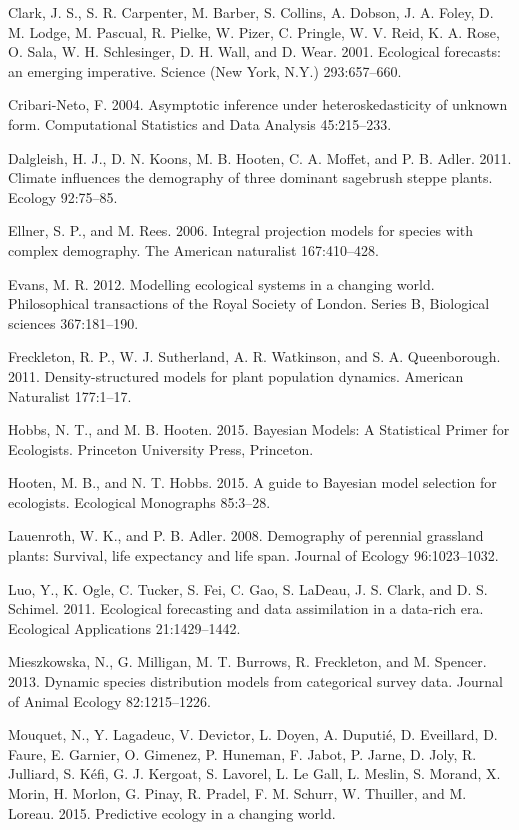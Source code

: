 \documentclass[12pt,]{article}
\begin{document}
Clark, J. S., S. R. Carpenter, M. Barber, S. Collins, A. Dobson, J. A.
Foley, D. M. Lodge, M. Pascual, R. Pielke, W. Pizer, C. Pringle, W. V.
Reid, K. A. Rose, O. Sala, W. H. Schlesinger, D. H. Wall, and D. Wear.
2001. Ecological forecasts: an emerging imperative. Science (New York,
N.Y.) 293:657--660.

Cribari-Neto, F. 2004. Asymptotic inference under heteroskedasticity of
unknown form. Computational Statistics and Data Analysis 45:215--233.

Dalgleish, H. J., D. N. Koons, M. B. Hooten, C. A. Moffet, and P. B.
Adler. 2011. Climate influences the demography of three dominant
sagebrush steppe plants. Ecology 92:75--85.

Ellner, S. P., and M. Rees. 2006. Integral projection models for species
with complex demography. The American naturalist 167:410--428.

Evans, M. R. 2012. Modelling ecological systems in a changing world.
Philosophical transactions of the Royal Society of London. Series B,
Biological sciences 367:181--190.

Freckleton, R. P., W. J. Sutherland, A. R. Watkinson, and S. A.
Queenborough. 2011. Density-structured models for plant population
dynamics. American Naturalist 177:1--17.

Hobbs, N. T., and M. B. Hooten. 2015. Bayesian Models: A Statistical
Primer for Ecologists. Princeton University Press, Princeton.

Hooten, M. B., and N. T. Hobbs. 2015. A guide to Bayesian model
selection for ecologists. Ecological Monographs 85:3--28.

Lauenroth, W. K., and P. B. Adler. 2008. Demography of perennial
grassland plants: Survival, life expectancy and life span. Journal of
Ecology 96:1023--1032.

Luo, Y., K. Ogle, C. Tucker, S. Fei, C. Gao, S. LaDeau, J. S. Clark, and
D. S. Schimel. 2011. Ecological forecasting and data assimilation in a
data-rich era. Ecological Applications 21:1429--1442.

Mieszkowska, N., G. Milligan, M. T. Burrows, R. Freckleton, and M.
Spencer. 2013. Dynamic species distribution models from categorical
survey data. Journal of Animal Ecology 82:1215--1226.

Mouquet, N., Y. Lagadeuc, V. Devictor, L. Doyen, A. Duputi{é}, D.
Eveillard, D. Faure, E. Garnier, O. Gimenez, P. Huneman, F. Jabot, P.
Jarne, D. Joly, R. Julliard, S. K{é}fi, G. J. Kergoat, S. Lavorel, L.
{Le Gall}, L. Meslin, S. Morand, X. Morin, H. Morlon, G. Pinay, R.
Pradel, F. M. Schurr, W. Thuiller, and M. Loreau. 2015. Predictive
ecology in a changing world.
\end{document}
